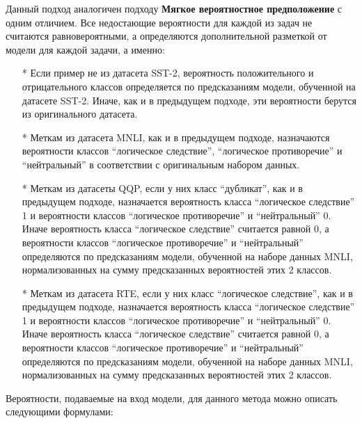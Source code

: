 Данный подход аналогичен подходу \textbf{Мягкое вероятностное предположение} с одним отличием. Все недостающие вероятности для каждой из задач не считаются равновероятными, а определяются дополнительной разметкой от модели для каждой задачи, а именно:
\begin{itemize}
\item[*] Если пример не из датасета SST-2, вероятность положительного и отрицательного классов определяется по предсказаниям модели, обученной на датасете SST-2. Иначе, как и в предыдущем подходе, эти вероятности берутся из оригинального датасета.
\item[*] Меткам из датасета MNLI, как и в предыдущем подходе, назначаются вероятности классов “логическое следствие”, “логическое противоречие” и “нейтральный” в соответствии с оригинальным набором данных.
\item[*] Меткам из датасеты QQP, если у них класс “дубликат”, как и в предыдущем подходе, назначается вероятность класса “логическое следствие” 1 и вероятности классов “логическое противоречие” и “нейтральный” 0. Иначе вероятность класса “логическое следствие” считается равной 0, а вероятности классов “логическое противоречие” и “нейтральный” определяются по предсказаниям модели, обученной на наборе данных MNLI, нормализованных на сумму предсказанных вероятностей этих 2 классов.
\item[*] Меткам из датасета RTE, если у них класс “логическое следствие”, как и в предыдущем подходе, назначается вероятность класса “логическое следствие” 1 и вероятности классов “логическое противоречие” и “нейтральный” 0.  Иначе вероятность класса “логическое следствие” считается равной 0, а вероятности классов “логическое противоречие” и “нейтральный” определяются по предсказаниям модели, обученной на наборе данных MNLI, нормализованных на сумму предсказанных вероятностей этих 2 классов.
\end{itemize}


Вероятности, подаваемые на вход модели, для данного метода можно описать следующими формулами:



